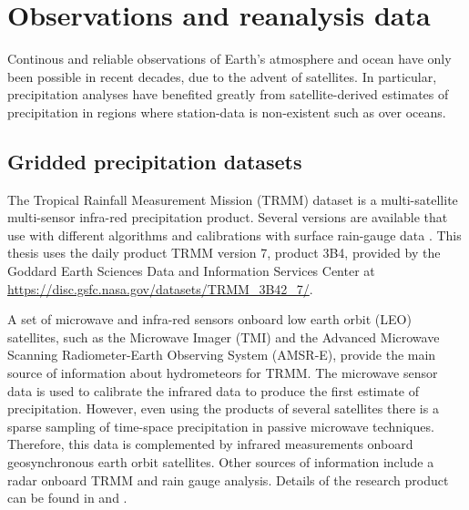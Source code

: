 \section{Observations and reanalysis data} \label{sq:obsdata}
Continous and reliable observations of Earth's  atmosphere and ocean have only been possible in recent decades, due to the advent of satellites. In particular, precipitation analyses have benefited greatly from satellite-derived estimates of precipitation in regions where station-data is non-existent such as over oceans. 



\subsection{Gridded precipitation datasets}


The Tropical Rainfall Measurement Mission (TRMM) dataset is a multi-satellite multi-sensor infra-red precipitation product. Several versions are available that use with different algorithms and calibrations with surface rain-gauge data \citep{huffman2007}. This thesis uses the daily product TRMM version 7, product 3B4, provided by the Goddard Earth Sciences Data and Information Services Center \citep{mission2011trmm} at \url{https://disc.gsfc.nasa.gov/datasets/TRMM_3B42_7/}.

 A set of microwave and infra-red sensors onboard low earth orbit (LEO) satellites, such as the Microwave Imager (TMI) and the Advanced Microwave Scanning Radiometer-Earth Observing System (AMSR-E), provide the main source of information about hydrometeors for TRMM. The microwave sensor data is used to calibrate the infrared data to produce the first estimate of precipitation. However, even using the products of several satellites there is a sparse sampling of time-space precipitation  in passive microwave techniques. Therefore, this data is complemented by infrared measurements onboard geosynchronous earth orbit satellites. Other sources of information include a radar onboard TRMM and rain gauge analysis. Details of the research product can be found in \cite{huffman2007} and \cite{mission2011}.

